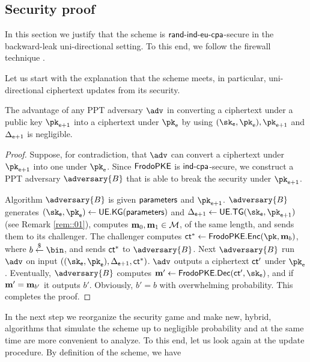\documentclass{fundam}
\begin{document}
\subsection{Security proof}
In this section we justify that the scheme is $\mathsf{rand}{\text{-}}\mathsf{ind}{\text{-}}\mathsf{eu}{\text{-}}\mathsf{cpa}$-secure in the backward-leak uni-directional setting. To this end, we follow the firewall technique \cite{jiang2020,nishimaki2022direction}.

Let us start with the explanation that the scheme meets, in particular, uni-directional ciphertext updates from its security.
\begin{theorem}
	The advantage of any PPT adversary $\adv$ in converting a ciphertext under a public key $\pk_{\epoch+1}$ into a ciphertext under $\pk_{\epoch}$ by using $(\sk_{\epoch},\pk_{\epoch}), \pk_{\epoch+1}$ and $\Delta_{\mathsf{e}+1}$ is negligible.
\end{theorem}	

\begin{proof}
Suppose, for contradiction, that $\adv$ can convert a ciphertext under $\pk_{\epoch+1}$ into one under $\pk_{\epoch}$. Since $\mathsf{FrodoPKE}$ is $\mathsf{ind}{\text{-}}\mathsf{cpa}$-secure, we construct a PPT adversary $\adversary{B}$ that is able to break the security under $\pk_{\epoch+1}$.  

Algorithm $\adversary{B}$ is given $\mathsf{parameters}$ and $\pk_{\epoch+1}$. $\adversary{B}$ generates $(\sk_{\epoch}, \pk_{\epoch})\gets \uekg(\params)$ and $\tok_{\epoch+1}\gets\uetg(\sk_{\epoch},\pk_{\epoch+1})$ (see Remark \ref{rem::01}), 
computes $\mathbf{m}_{0}, \mathbf{m}_{1}\in\mathcal{M}$, of the same length, and sends them to its challenger. The challenger computes $\ct^{*}\gets \tx{FrodoPKE.Enc}(\pk, \m_{b})$, where $b\sample\bin$, and sends $\mathsf{ct}^{*}$ to $\adversary{B}$. Next $\adversary{B}$ run $\adv$ on input $((\sk_{\epoch},\pk_{\epoch}),\tok_{\epoch+1}, \ct^{*})$. $\adv$ outputs a ciphertext $\mathsf{ct}'$ under $\pk_{\epoch}$. Eventually, $\adversary{B}$ computes $\m'\gets \tx{FrodoPKE.Dec}(\ct', \sk_{\epoch})$, and if $\mathbf{m}' = \mathbf{m}_{b'}$ it outputs $b'$. Obviously, $b'=b$ with overwhelming probability. This completes the proof.

\end{proof}	

In the next step we reorganize the security game and make new, hybrid, algorithms that simulate the scheme up to negligible probability and at the same time are more convenient to analyze. To this end, let us look again at the update procedure. By definition of the scheme, we have 
\end{document}
